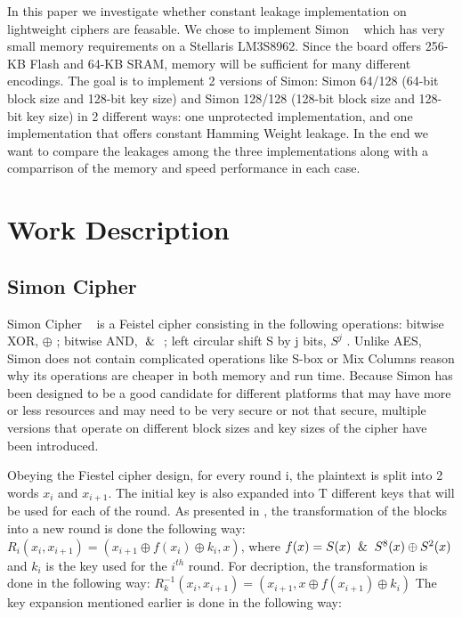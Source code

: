 \documentclass[conference]{IEEEtran}
\begin{document}
In this paper we investigate whether constant leakage implementation on lightweight ciphers are feasable. We chose to implement Simon ~\cite{Beaulieu_Simon} which has very small memory requirements on a Stellaris LM3S8962. Since the board offers 256-KB Flash and 64-KB SRAM, memory will be sufficient for many different encodings. The goal is to implement 2 versions of Simon: Simon 64/128 (64-bit block size and 128-bit key size) and Simon 128/128 (128-bit block size and 128-bit key size) in 2 different ways: one unprotected implementation, and one implementation that offers constant Hamming Weight leakage. In the end we want to compare the leakages among the three implementations along with a comparrison of the memory and speed performance in each case.

\section{Work Description}

\subsection{Simon Cipher}

Simon Cipher ~\cite{Beaulieu_Simon} is a Feistel cipher consisting in the following operations: bitwise XOR, $\oplus$ ; bitwise AND, $\And$ ; left circular shift S by j bits, $S^j$ . Unlike AES, Simon does not contain complicated operations like S-box or Mix Columns reason why its operations are cheaper in both memory and run time. Because Simon has been designed to be a good candidate for different platforms that may have more or less resources and may need to be very secure or not that secure, multiple versions that operate on different block sizes and key sizes of the cipher have been introduced.

Obeying the Fiestel cipher design, for every round i, the plaintext is split into 2 words $x_{i}$ and $x_{i+1}$. The initial key is also expanded into T different keys that will be used for each of the round. As presented in \cite{Beaulieu_Simon} , the transformation of the blocks into a new round is done the following way:
$R_{i}(x_{i}, x_{i+1}) = (x_{i+1} \oplus f(x_{i}) \oplus k_{i}, x)$, where
$f(x) = S(x) \And S^{8}(x) \oplus S^{2}(x)$ and $k_{i}$ is the key used for the $i^{th}$ round. For decription, the transformation is done in the following way:
$R_{k}^{-1}(x_{i}, x_{i+1}) = (x_{i+1}, x \oplus f(x_{i+1}) \oplus k_{i})$
The key expansion mentioned earlier is done in the following way:
\end{document}
